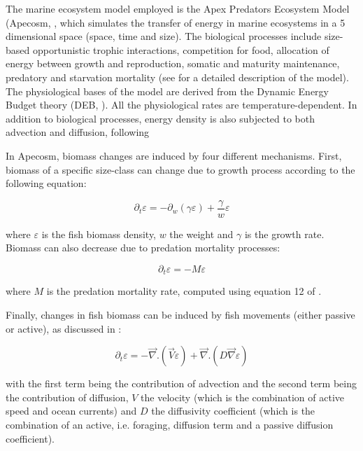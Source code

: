 The marine ecosystem model employed is the Apex Predators Ecosystem Model (Apecosm, \citealt{mauryModelingEnvironmentalEffects2007, mauryOverviewAPECOSMSpatialized2010}, which simulates the transfer of energy in marine ecosystems in a 5 dimensional space (space, time and size). The biological processes include size-based opportunistic trophic interactions, competition for food, allocation of energy between growth and reproduction, somatic and maturity maintenance, predatory and starvation mortality (see \citealt{mauryModelingEnvironmentalEffects2007} for a detailed description of the model). The physiological bases of the model are derived from the Dynamic Energy Budget theory (DEB, \cite{kooijmanDynamicEnergyMass2000}). All the physiological rates are temperature-dependent. In addition to biological processes, energy density is also subjected to both advection and diffusion, following \cite{faugerasAdvectiondiffusionreactionSizestructuredFish2005}

In Apecosm, biomass changes are induced by four different mechanisms. First, biomass of a specific size-class can change due to growth process according to the following equation:

\begin{equation}
\partial_t \varepsilon = - \partial_w(\gamma \varepsilon) + \frac{\gamma}{w}\varepsilon
\end{equation}

where $\varepsilon$  is the fish biomass density, $w$ the weight and $\gamma$ is the growth rate. Biomass can also decrease due to predation mortality processes:

\begin{equation}
\partial_t \varepsilon = - M \varepsilon
\end{equation}

where $M$ is the predation mortality rate, computed using equation 12 of \cite{mauryIndividualsPopulationsCommunities2013}. 

Finally, changes in fish biomass can be induced by fish movements (either passive or active), as discussed in \cite{faugerasAdvectiondiffusionreactionSizestructuredFish2005}:

\begin{equation}
\partial_t \varepsilon = -\overrightarrow{\nabla}.(\overrightarrow{V} \varepsilon) + \overrightarrow{\nabla} . (D \overrightarrow{\nabla} \varepsilon)
\end{equation}

with the first term being the contribution of advection and the second term being the contribution of diffusion, $V$ the velocity (which is the combination of active speed and ocean currents) and $D$ the diffusivity coefficient (which is the combination of an active, i.e. foraging, diffusion term and a passive diffusion coefficient).

